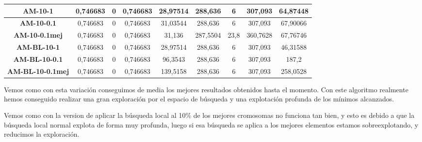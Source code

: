 \documentclass[12pt, spanish]{article}
\begin{document}
\begin{table}[H]
\begin{tabular}{|c|c|c|c|c|c|c|c|c|}
\textbf{AM-10-1}         & 0,746683                  & 0                           & 0,746683               & 28,97514   & 288,636                   & 6                           & 307,093                & 64,87448   \\ \hline
\textbf{AM-10-0.1}       & 0,746683                  & 0                           & 0,746683               & 31,03544   & 288,636                   & 6                           & 307,093                & 67,90066   \\ \hline
\textbf{AM-10-0.1mej}    & 0,746683                  & 0                           & 0,746683               & 31,136     & 287,5504                  & 23,8                        & 360,7628               & 67,76746   \\ \hline
\textbf{AM-BL-10-1}      & 0,746683                  & 0                           & 0,746683               & 28,97514   & 288,636                   & 6                           & 307,093                & 46,31588   \\ \hline
\textbf{AM-BL-10-0.1}    & 0,746683                  & 0                           & 0,746683               & 96,3543    & 288,636                   & 6                           & 307,093                & 187,2      \\ \hline
\textbf{AM-BL-10-0.1mej} & 0,746683                  & 0                           & 0,746683               & 139,5158   & 288,636                   & 6                           & 307,093                & 258,0528   \\ \hline
\end{tabular}
\end{table}


Vemos como con esta variación conseguimos de media los mejores resultados obtenidos hasta el momento. Con este algoritmo realmente hemos conseguido realizar una  gran exploración por el espacio de búsqueda y una explotación profunda de los mínimos alcanzados.

Vemos como con la version de aplicar la búsqueda local al 10\% de los mejores cromosomas no funciona tan bien, y esto es debido a que la búsqueda local normal explota de forma muy profunda, luego si esa búsqueda se aplica a los mejores elementos estamos sobreexplotando, y reducimos la exploración.


\newpage
\end{document}

